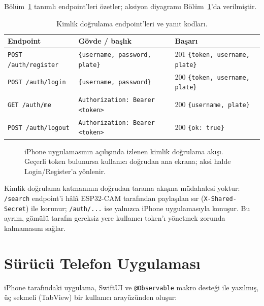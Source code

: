 Bölüm~\ref{tab:auth-endpoints} tanımlı endpoint'leri özetler; aksiyon
diyagramı Bölüm~\ref{fig:auth-akisi}'da verilmiştir.

\begin{table}[h!]
\centering
\caption{Kimlik doğrulama endpoint'leri ve yanıt kodları.}
\label{tab:auth-endpoints}
\small
\begin{tabularx}{\linewidth}{l X l}
\toprule
\textbf{Endpoint} & \textbf{Gövde / başlık} & \textbf{Başarı}\\
\midrule
\texttt{POST /auth/register} & \texttt{\{username, password, plate\}} & 201 \texttt{\{token, username, plate\}} \\
\texttt{POST /auth/login}    & \texttt{\{username, password\}}        & 200 \texttt{\{token, username, plate\}} \\
\texttt{GET\phantom{ } /auth/me} & \texttt{Authorization: Bearer <token>} & 200 \texttt{\{username, plate\}} \\
\texttt{POST /auth/logout}   & \texttt{Authorization: Bearer <token>} & 200 \texttt{\{ok: true\}} \\
\bottomrule
\end{tabularx}
\end{table}

\begin{figure}[h!]
\centering
{}
\caption{iPhone uygulamasının açılışında izlenen kimlik doğrulama akışı.
Geçerli token bulunursa kullanıcı doğrudan ana ekrana; aksi halde Login/Register'a yönlenir.}
\label{fig:auth-akisi}
\end{figure}

Kimlik doğrulama katmanının doğrudan tarama akışına müdahalesi yoktur:
\texttt{/search} endpoint'i hâlâ ESP32-CAM tarafından paylaşılan sır
(\texttt{X-Shared-Secret}) ile korunur; \texttt{/auth/...} ise yalnızca
iPhone uygulamasıyla konuşur. Bu ayrım, gömülü tarafın gereksiz yere
kullanıcı token'ı yönetmek zorunda kalmamasını sağlar.

\section{Sürücü Telefon Uygulaması}
\label{sec:iphone-app}

iPhone tarafındaki uygulama, SwiftUI ve \texttt{@Observable} makro
desteği ile yazılmış, üç sekmeli (TabView) bir kullanıcı arayüzünden
oluşur:

